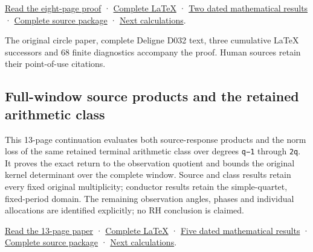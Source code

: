 \documentclass[
]{article}
\begin{document}
\href{https://github.com/KokunoYumeto/zeta-function-research-reader/blob/main/workbenches/splitzero-tandem/continuations/20260919-circle-heat-original-metrics/HEAT_TO_ORIGINAL_QUOTIENT_METRICS.pdf}{Read
the eight-page proof} ·
\href{https://github.com/KokunoYumeto/zeta-function-research-reader/blob/main/workbenches/splitzero-tandem/continuations/20260919-circle-heat-original-metrics/HEAT_TO_ORIGINAL_QUOTIENT_METRICS.tex}{Complete
LaTeX} ·
\href{https://github.com/KokunoYumeto/zeta-function-research-reader/blob/main/workbenches/splitzero-tandem/continuations/20260919-circle-heat-original-metrics/NEW_RESULTS_2026-09-19.md}{Two
dated mathematical results} ·
\href{https://github.com/KokunoYumeto/zeta-function-research-reader/blob/main/workbenches/splitzero-tandem/continuations/20260919-circle-heat-original-metrics/README.md}{Complete
source package} ·
\href{https://github.com/KokunoYumeto/zeta-function-research-reader/blob/main/workbenches/splitzero-tandem/continuations/20260919-circle-heat-original-metrics/CONTINUATION.md}{Next
calculations}.

The original circle paper, complete Deligne D032 text, three cumulative
LaTeX successors and 68 finite diagnostics accompany the proof. Human
sources retain their point-of-use citations.

\subsection{Full-window source products and the retained arithmetic
class}\label{full-window-source-products-and-the-retained-arithmetic-class}

This 13-page continuation evaluates both source-response products and
the norm loss of the same retained terminal arithmetic class over
degrees \texttt{q−1} through \texttt{2q}. It proves the exact return to
the observation quotient and bounds the original kernel determinant over
the complete window. Source and class results retain every fixed
original multiplicity; conductor results retain the simple-quartet,
fixed-period domain. The remaining observation angles, phases and
individual allocations are identified explicitly; no RH conclusion is
claimed.

\href{https://github.com/KokunoYumeto/zeta-function-research-reader/blob/main/workbenches/splitzero-tandem/continuations/20260919-full-window-source-products/FULL_WINDOW_SOURCE_PRODUCTS.pdf}{Read
the 13-page paper} ·
\href{https://github.com/KokunoYumeto/zeta-function-research-reader/blob/main/workbenches/splitzero-tandem/continuations/20260919-full-window-source-products/FULL_WINDOW_SOURCE_PRODUCTS.tex}{Complete
LaTeX} ·
\href{https://github.com/KokunoYumeto/zeta-function-research-reader/blob/main/workbenches/splitzero-tandem/continuations/20260919-full-window-source-products/NEW_RESULTS_2026-09-19.md}{Five
dated mathematical results} ·
\href{https://github.com/KokunoYumeto/zeta-function-research-reader/blob/main/workbenches/splitzero-tandem/continuations/20260919-full-window-source-products/README.md}{Complete
source package} ·
\href{https://github.com/KokunoYumeto/zeta-function-research-reader/blob/main/workbenches/splitzero-tandem/continuations/20260919-full-window-source-products/WEB_CONTINUATION_PROMPT.md}{Next
calculations}.
\end{document}
